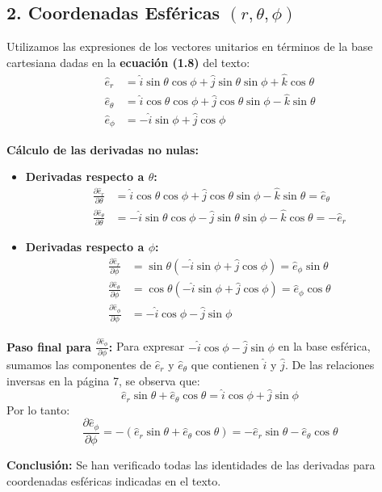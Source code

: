 \documentclass[a4paper]{article}
\begin{document}
\subsection*{2. Coordenadas Esféricas $(r, \theta, \phi)$}

Utilizamos las expresiones de los vectores unitarios en términos de la base cartesiana dadas en la \textbf{ecuación (1.8)} del texto:
\begin{align*}
    \hat{e}_r &= \hat{i} \sin\theta \cos\phi + \hat{j} \sin\theta \sin\phi + \hat{k} \cos\theta \\
    \hat{e}_\theta &= \hat{i} \cos\theta \cos\phi + \hat{j} \cos\theta \sin\phi - \hat{k} \sin\theta \\
    \hat{e}_\phi &= -\hat{i} \sin\phi + \hat{j} \cos\phi
\end{align*}

\textbf{Cálculo de las derivadas no nulas:}
\begin{itemize}
    \item \textbf{Derivadas respecto a $\theta$:}
    \begin{align*}
        \frac{\partial \hat{e}_r}{\partial \theta} &= \hat{i} \cos\theta \cos\phi + \hat{j} \cos\theta \sin\phi - \hat{k} \sin\theta = \hat{e}_\theta \\
        \frac{\partial \hat{e}_\theta}{\partial \theta} &= -\hat{i} \sin\theta \cos\phi - \hat{j} \sin\theta \sin\phi - \hat{k} \cos\theta = -\hat{e}_r
    \end{align*}
    \item \textbf{Derivadas respecto a $\phi$:}
    \begin{align*}
        \frac{\partial \hat{e}_r}{\partial \phi} &= \sin\theta (-\hat{i} \sin\phi + \hat{j} \cos\phi) = \hat{e}_\phi \sin\theta \\
        \frac{\partial \hat{e}_\theta}{\partial \phi} &= \cos\theta (-\hat{i} \sin\phi + \hat{j} \cos\phi) = \hat{e}_\phi \cos\theta \\
        \frac{\partial \hat{e}_\phi}{\partial \phi} &= -\hat{i} \cos\phi - \hat{j} \sin\phi
    \end{align*}
\end{itemize}

\textbf{Paso final para $\frac{\partial \hat{e}_\phi}{\partial \phi}$:} 
Para expresar $-\hat{i} \cos\phi - \hat{j} \sin\phi$ en la base esférica, sumamos las componentes de $\hat{e}_r$ y $\hat{e}_\theta$ que contienen $\hat{i}$ y $\hat{j}$. De las relaciones inversas en la página 7, se observa que:
\begin{equation*}
    \hat{e}_r \sin\theta + \hat{e}_\theta \cos\theta = \hat{i} \cos\phi + \hat{j} \sin\phi
\end{equation*}
Por lo tanto:
\begin{equation*}
    \frac{\partial \hat{e}_\phi}{\partial \phi} = -(\hat{e}_r \sin\theta + \hat{e}_\theta \cos\theta) = -\hat{e}_r \sin\theta - \hat{e}_\theta \cos\theta
\end{equation*}

\textbf{Conclusión:} Se han verificado todas las identidades de las derivadas para coordenadas esféricas indicadas en el texto.



 
\end{document}
